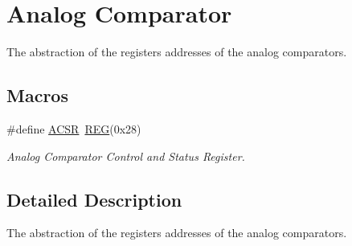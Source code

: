 \hypertarget{group__ACMCAL}{\section{Analog Comparator}
\label{group__ACMCAL}
}


The abstraction of the registers addresses of the analog comparators.  


\subsection*{Macros}
\begin{DoxyCompactItemize}
\item 
\hypertarget{group__ACMCAL_gaac2b95102c1abf98a9d4b7e88a01a385}{\#define \hyperlink{group__ACMCAL_gaac2b95102c1abf98a9d4b7e88a01a385}{A\+C\+S\+R}~\hyperlink{group__MCAL_ga72e45020e46f285689db51c46f273403}{R\+E\+G}(0x28)}\label{group__ACMCAL_gaac2b95102c1abf98a9d4b7e88a01a385}

\begin{DoxyCompactList}\small\item\em Analog Comparator Control and Status Register. \end{DoxyCompactList}\end{DoxyCompactItemize}


\subsection{Detailed Description}
The abstraction of the registers addresses of the analog comparators. 

